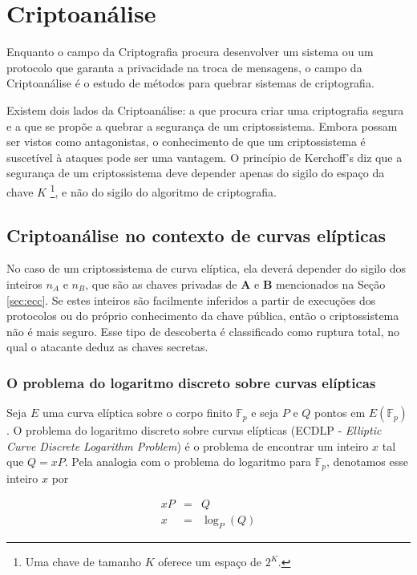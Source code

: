 %
%
\chapter{Criptoanálise}
Enquanto o campo da Criptografia procura desenvolver um sistema ou um protocolo que garanta a privacidade na troca de mensagens, o campo da Criptoanálise é o estudo de métodos para quebrar sistemas de criptografia.

Existem dois lados da Criptoanálise: a que procura criar uma criptografia segura e a que se propõe a quebrar a segurança de um criptossistema. Embora possam ser vistos como antagonistas, o conhecimento de que um criptossistema é suscetível à ataques pode ser uma vantagem. O princípio de Kerchoff's diz que a segurança de um criptossistema deve depender apenas do sigilo do espaço da chave \(K\) \footnote{Uma chave de tamanho \(K\) oferece um espaço de \(2^K\).}, e não do sigilo do algoritmo de criptografia. \cite{Mandy:2007}

%
%
\section{Criptoanálise no contexto de curvas elípticas}
No caso de um criptossistema de curva elíptica, ela deverá depender do sigilo dos inteiros \(n_A\) e \(n_B\), que são as chaves privadas de \textbf{A} e \textbf{B} mencionados na Seção \ref{sec:ecc}. Se estes inteiros são facilmente inferidos a partir de execuções dos protocolos ou do próprio conhecimento da chave pública, então o criptossistema não é mais seguro. Esse tipo de descoberta é classificado como ruptura total, no qual o atacante deduz as chaves secretas. \cite{Knudsen:1998}

%
%
\subsection{O problema do logaritmo discreto sobre curvas elípticas} \label{ecdlp}
Seja \(E\) uma curva elíptica sobre o corpo finito $\mathbb{F}_p$ e seja \(P\) e \(Q\) pontos em $E(\mathbb{F}_p)$. O problema do logaritmo discreto sobre curvas elípticas (ECDLP - \textit{Elliptic Curve Discrete Logarithm Problem}) é o problema de encontrar um inteiro \(x\) tal que $Q = xP$. Pela analogia com o problema do logaritmo para $\mathbb{F}_p$, denotamos esse inteiro \(x\) por

\begin{eqnarray}
xP &=& Q \label{eq:ecdlp1} \\
x &=& \log_P(Q) \label{eq:ecdlp2}
\end{eqnarray}

